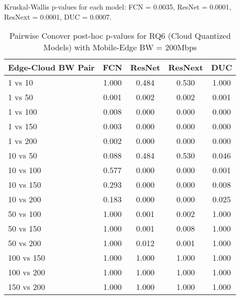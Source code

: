 \begin{table}[h]
\centering
\caption{Pairwise Conover post-hoc p-values for RQ6 (Cloud Quantized Models) with Mobile-Edge BW = 200Mbps}
\label{tab:conover_cloud_quantized_me200}
\smallskip
Kruskal-Wallis p-values for each model: FCN = 0.0035, ResNet = 0.0001, ResNext = 0.0001, DUC = 0.0007.

\begin{tabular}{lcccc}
\toprule
Edge-Cloud BW Pair & FCN & ResNet & ResNext & DUC \\
\midrule
1 vs 10 & 1.000 & 0.484 & 0.530 & 1.000 \\
1 vs 50 & 0.001 & 0.002 & 0.002 & 0.001 \\
1 vs 100 & 0.008 & 0.000 & 0.000 & 0.000 \\
1 vs 150 & 0.003 & 0.000 & 0.000 & 0.000 \\
1 vs 200 & 0.002 & 0.000 & 0.000 & 0.000 \\
10 vs 50 & 0.088 & 0.484 & 0.530 & 0.046 \\
10 vs 100 & 0.577 & 0.000 & 0.000 & 0.001 \\
10 vs 150 & 0.293 & 0.000 & 0.000 & 0.008 \\
10 vs 200 & 0.183 & 0.000 & 0.000 & 0.025 \\
50 vs 100 & 1.000 & 0.001 & 0.002 & 1.000 \\
50 vs 150 & 1.000 & 0.001 & 0.008 & 1.000 \\
50 vs 200 & 1.000 & 0.012 & 0.001 & 1.000 \\
100 vs 150 & 1.000 & 1.000 & 1.000 & 1.000 \\
100 vs 200 & 1.000 & 1.000 & 1.000 & 1.000 \\
150 vs 200 & 1.000 & 1.000 & 1.000 & 1.000 \\
\bottomrule
\end{tabular}
\end{table}

